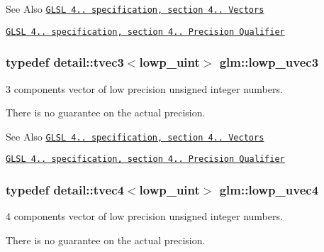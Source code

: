 \begin{DoxySeeAlso}{See Also}
\href{http://www.opengl.org/registry/doc/GLSLangSpec.4.20.8.pdf}{\tt G\-L\-S\-L 4.. specification, section 4.. Vectors} 

\href{http://www.opengl.org/registry/doc/GLSLangSpec.4.20.8.pdf}{\tt G\-L\-S\-L 4.. specification, section 4.. Precision Qualifier} 
\end{DoxySeeAlso}
\hypertarget{group__core__precision_ga45a3d9b09e9077ea280d8a1d599c7cae}{
\subsubsection[{lowp\-\_\-uvec3}]{\setlength{\rightskip}{0pt plus 5cm}typedef detail\-::tvec3$<$lowp\-\_\-uint$>$ {\bf glm\-::lowp\-\_\-uvec3}}}\label{group__core__precision_ga45a3d9b09e9077ea280d8a1d599c7cae}


3 components vector of low precision unsigned integer numbers. 

There is no guarantee on the actual precision.

\begin{DoxySeeAlso}{See Also}
\href{http://www.opengl.org/registry/doc/GLSLangSpec.4.20.8.pdf}{\tt G\-L\-S\-L 4.. specification, section 4.. Vectors} 

\href{http://www.opengl.org/registry/doc/GLSLangSpec.4.20.8.pdf}{\tt G\-L\-S\-L 4.. specification, section 4.. Precision Qualifier} 
\end{DoxySeeAlso}
\hypertarget{group__core__precision_gae312816bc8b9b803de46b9fb2da036eb}{
\subsubsection[{lowp\-\_\-uvec4}]{\setlength{\rightskip}{0pt plus 5cm}typedef detail\-::tvec4$<$lowp\-\_\-uint$>$ {\bf glm\-::lowp\-\_\-uvec4}}}\label{group__core__precision_gae312816bc8b9b803de46b9fb2da036eb}


4 components vector of low precision unsigned integer numbers. 

There is no guarantee on the actual precision.

